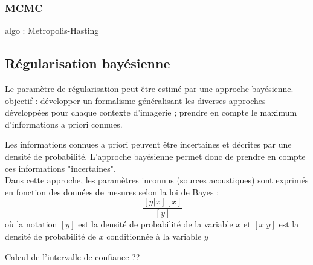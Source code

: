 \subsubsection{MCMC}
algo : Metropolis-Hasting







\subsection{Régularisation bayésienne}

Le paramètre de régularisation peut être estimé par une approche bayésienne. 
objectif : développer un formalisme généralisant les diverses approches développées pour chaque contexte d'imagerie ; prendre en compte le maximum d'informations a priori connues.

Les informations connues a priori peuvent être incertaines et décrites par une densité de probabilité. L'approche bayésienne permet donc de prendre en compte ces informations "incertaines".\\
Dans cette approche, les paramètres inconnus (sources acoustiques) sont exprimés en fonction des données de mesures selon la loi de Bayes : 
\begin{equation}
[x|y] = \frac{[y|x][x]}{[y]}
\end{equation}
où la notation $[y]$ est la densité de probabilité de la variable $x$ et $[x|y]$ est la densité de probabilité de $x$ conditionnée à la variable $y$





Calcul de l'intervalle de confiance ??
	
